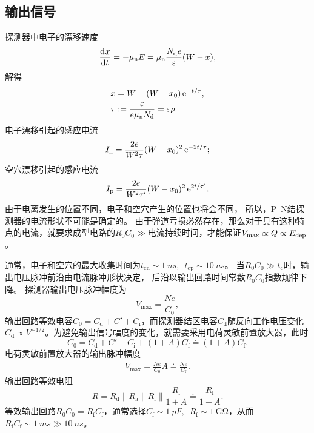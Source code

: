 \subsection{输出信号}

探测器中电子的漂移速度
\[
	\frac{\mathop{}\!\mathrm{d}^{}x}{\mathrm{d}{t}^{}} = -\mu_{\mathrm{n}}E = \mu_{\mathrm{n}}\frac{N_{\mathrm{d}}e}\varepsilon(W - x),
\]
解得
\begin{subequations}
	\begin{align}
		x &= W - (W - x_0)\mathop{}\!\mathrm{e}^{-t/\tau},\\
		\tau &:= \frac\varepsilon{e\mu_{\mathrm{n}}N_{\mathrm{d}}} = \varepsilon\rho.
	\end{align}
\end{subequations}
电子漂移引起的感应电流
\begin{equation}\label{eq:nrd-induced-electron-current}
	I_{\mathrm{n}} = \frac{2e}{W^2\tau}(W - x_0)^2\mathop{}\!\mathrm{e}^{-2t/\tau};
\end{equation}
空穴漂移引起的感应电流
\begin{equation}\label{eq:nrd-induced-hole-current}
	I_{\mathrm{p}} = \frac{2e}{W^2\tau'}(W - x_0)^2\e^{2t/\tau'}.%
\end{equation}
由于电离发生的位置不同，电子和空穴产生的位置也将会不同，%
所以，P--N结探测器的电流形状不可能是确定的。
由于弹道亏损必然存在，那么对于具有这种特点的电流，就要求成型电路的$R_0C_0 \gg$电流持续时间，才能保证$V_{\max} \propto Q \propto E_{\mathrm{dep}}$。

通常，电子和空穴的最大收集时间为$t_{\mathrm{cn}} \sim \qty{1}{ns},\enspace t_{\mathrm{cp}} \sim \qty{10}{ns}$。
当$R_0C_0 \gg t_{\mathrm{c}}$时，输出电压脉冲前沿由电流脉冲形状决定，
后沿以输出回路时间常数$R_0C_0$指数规律下降。
探测器输出电压脉冲幅度为
\begin{equation}\label{eq:nrd-charge-pulse-voltage}
	V_{\max} = \frac{Ne}{C_0},
\end{equation}
输出回路等效电容$C_0 = C_{\mathrm{d}} + C' + C_{\mathrm{i}}$，而探测器结区电容$C_{\mathrm{d}}$随反向工作电压变化$C_{\mathrm{d}} \propto V^{-1/2}$。为避免输出信号幅度的变化，就需要采用电荷灵敏前置放大器，此时
\begin{equation}\label{eq:nrd-preamplifier-input-capacitance}
	C_0 = C_{\mathrm{d}} + C' + C_{\mathrm{i}} + (1 + A)C_{\mathrm{f}} \doteq (1 + A)C_{\mathrm{f}}.
\end{equation}
电荷灵敏前置放大器的输出脉冲幅度
\begin{align}
	V_{\max} = \frac{Ne}{C_0}A \doteq \frac{Ne}{C_{\mathrm{f}}}.
\end{align}
输出回路等效电阻
\[
	R = R_{\mathrm{d}} \parallel R_{\mathrm{a}} \parallel R_{\mathrm{i}} \parallel \frac{R_{\mathrm{f}}}{1 + A} \doteq \frac{R_{\mathrm{f}}}{1 + A}.
\]
等效输出回路$R_0C_0 = R_{\mathrm{f}}C_{\mathrm{f}}$，通常选择$C_{\mathrm{f}} \sim \qty{1}{pF},\enspace R_{\mathrm{f}} \sim \qty{1}{\giga\ohm}$，从而$R_{\mathrm{f}}C_{\mathrm{f}} \sim \qty{1}{ms} \gg \qty{10}{ns}$。

